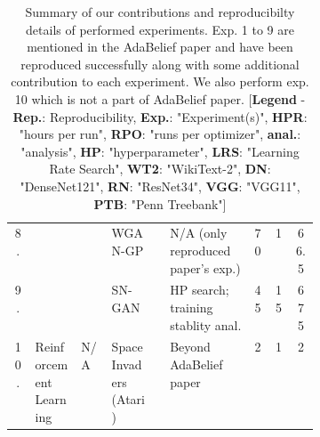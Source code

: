 \begin{table}[t]
{\begin{tabular}{c  p{0.15\linewidth}  p{0.1\linewidth}  p{0.15\linewidth}  c  l  c  c  c}
		\cline{4-9}
		8. \rule{0pt}{9pt} & &   & WGAN-GP \cite{WGAN-GP} & \textcolor{green}{\checkmark} & N/A (only reproduced paper's \cite{zhuang_adabelief_2020} exp.) & 70 & 1 & 66.5 \\

		\cline{4-9}
		9. \rule{0pt}{9pt} & &   & SN-GAN \cite{SN-GAN} & \textcolor{green}{\checkmark} & HP search; training stablity anal. & 45 & 15 & 675 \\

		\hline
		10. & Reinforcement Learning & N/A & Space Invaders (Atari) & \textcolor{green}{\checkmark} & Beyond AdaBelief paper \cite{zhuang_adabelief_2020} & 2 & 1 & 2 \\

		\hline
		\end{tabular}
		}

		\vspace{2mm}
		\caption{Summary of our contributions and reproducibilty details of performed experiments. Exp. 1 to 9 are mentioned in the AdaBelief paper \cite{zhuang_adabelief_2020} and have been reproduced successfully along with some additional contribution to each experiment. We also perform exp. 10 which is not a part of AdaBelief paper.\hspace{\textwidth} [\textbf{Legend} - \textbf{Rep.}: Reproducibility, \textbf{Exp.}: "Experiment(s)", \textbf{HPR}: "hours per run", \textbf{RPO}: "runs per optimizer", \textbf{anal.}: "analysis", \textbf{HP}: "hyperparameter", \textbf{LRS}: "Learning Rate Search", \textbf{WT2}: "WikiText-2", \textbf{DN}: "DenseNet121", \textbf{RN}: "ResNet34", \textbf{VGG}: "VGG11", \textbf{PTB}: "Penn Treebank"]}
		\label{table:our_contribution}
\end{table}




